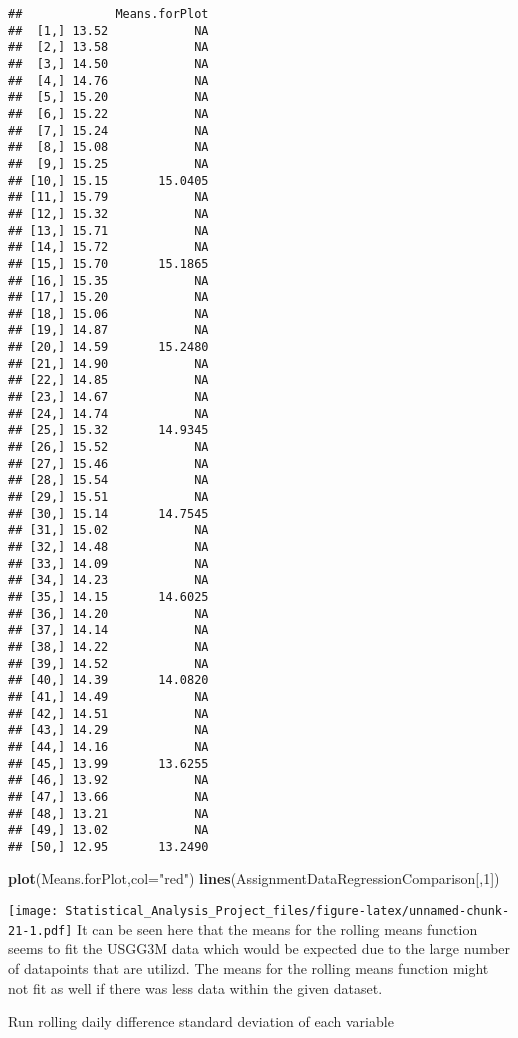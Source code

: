 \documentclass[]{article}
\newenvironment{Shaded}{\begin{snugshade}}{\end{snugshade}}
\newcommand{\KeywordTok}[1]{\textcolor[rgb]{0.13,0.29,0.53}{\textbf{#1}}}
\newcommand{\DataTypeTok}[1]{\textcolor[rgb]{0.13,0.29,0.53}{#1}}
\newcommand{\DecValTok}[1]{\textcolor[rgb]{0.00,0.00,0.81}{#1}}
\newcommand{\StringTok}[1]{\textcolor[rgb]{0.31,0.60,0.02}{#1}}
\newcommand{\NormalTok}[1]{#1}
\begin{document}
\begin{verbatim}
##             Means.forPlot
##  [1,] 13.52            NA
##  [2,] 13.58            NA
##  [3,] 14.50            NA
##  [4,] 14.76            NA
##  [5,] 15.20            NA
##  [6,] 15.22            NA
##  [7,] 15.24            NA
##  [8,] 15.08            NA
##  [9,] 15.25            NA
## [10,] 15.15       15.0405
## [11,] 15.79            NA
## [12,] 15.32            NA
## [13,] 15.71            NA
## [14,] 15.72            NA
## [15,] 15.70       15.1865
## [16,] 15.35            NA
## [17,] 15.20            NA
## [18,] 15.06            NA
## [19,] 14.87            NA
## [20,] 14.59       15.2480
## [21,] 14.90            NA
## [22,] 14.85            NA
## [23,] 14.67            NA
## [24,] 14.74            NA
## [25,] 15.32       14.9345
## [26,] 15.52            NA
## [27,] 15.46            NA
## [28,] 15.54            NA
## [29,] 15.51            NA
## [30,] 15.14       14.7545
## [31,] 15.02            NA
## [32,] 14.48            NA
## [33,] 14.09            NA
## [34,] 14.23            NA
## [35,] 14.15       14.6025
## [36,] 14.20            NA
## [37,] 14.14            NA
## [38,] 14.22            NA
## [39,] 14.52            NA
## [40,] 14.39       14.0820
## [41,] 14.49            NA
## [42,] 14.51            NA
## [43,] 14.29            NA
## [44,] 14.16            NA
## [45,] 13.99       13.6255
## [46,] 13.92            NA
## [47,] 13.66            NA
## [48,] 13.21            NA
## [49,] 13.02            NA
## [50,] 12.95       13.2490
\end{verbatim}

\begin{Shaded}
\begin{Highlighting}[]
\KeywordTok{plot}\NormalTok{(Means.forPlot,}\DataTypeTok{col=}\StringTok{"red"}\NormalTok{)}
\KeywordTok{lines}\NormalTok{(AssignmentDataRegressionComparison[,}\DecValTok{1}\NormalTok{])}
\end{Highlighting}
\end{Shaded}

\texttt{[image: Statistical\_Analysis\_Project\_files/figure-latex/unnamed-chunk-21-1.pdf]}
It can be seen here that the means for the rolling means function seems
to fit the USGG3M data which would be expected due to the large number
of datapoints that are utilizd. The means for the rolling means function
might not fit as well if there was less data within the given dataset.

Run rolling daily difference standard deviation of each variable
\end{document}

